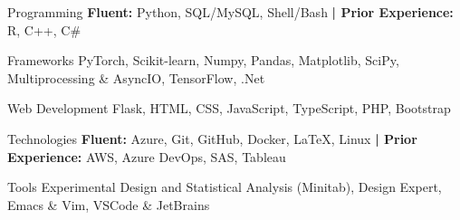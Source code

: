 

\begin{cvskills}


\cvskill
    {Programming} %
        {\textbf{Fluent:} Python, SQL/MySQL, Shell/Bash \textbf{| Prior Experience:} R, C++, C\#} %


\cvskill
    {Frameworks} %
    {PyTorch, Scikit-learn, Numpy, Pandas, Matplotlib, SciPy, Multiprocessing \& AsyncIO, TensorFlow, .Net} %


\cvskill
    {Web Development} %
    {Flask, HTML, CSS, JavaScript, TypeScript, PHP, Bootstrap} %
    

\cvskill
    {Technologies} %
    {\textbf{Fluent:} Azure, Git, GitHub, Docker, LaTeX, Linux \textbf{| Prior Experience:} AWS, Azure DevOps, SAS, Tableau} %
    


\vspace{0.3cm}
\cvskill
    {Tools}
    {Experimental Design and Statistical Analysis (Minitab), Design Expert, Emacs \& Vim, VSCode \& JetBrains}



\end{cvskills}

